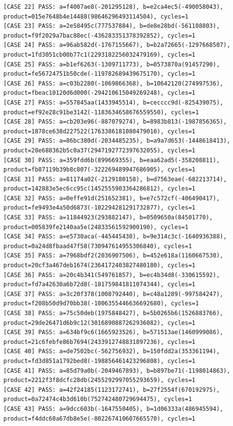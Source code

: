 \documentclass{article}
\begin{document}
\begin{verbatim}
[CASE 22] PASS: a=f4007ae8(-201295128), b=e2ca4ec5(-490058043), product=015e7648b4e14488(98646296493114504), cycles=1
[CASE 23] PASS: a=2e58495c(777537884), b=de8e28bd(-561108803), product=f9f2029a7bac88ec(-436283351378392852), cycles=1
[CASE 24] PASS: a=96ab582d(-1767155667), b=b2a72665(-1297668507), product=1fd3051cb00b77c1(2293182256032479169), cycles=1
[CASE 25] PASS: a=b1ef6263(-1309711773), b=0573870a(91457290), product=fe56724751b50cde(-119782689439675170), cycles=1
[CASE 26] PASS: a=c03b2280(-1069866368), b=10642120(274997536), product=fbeac10120d6d000(-294210615049269248), cycles=1
[CASE 27] PASS: a=557845aa(1433945514), b=cecccc9d(-825439075), product=ef92e28c91be3142(-1183634658676559550), cycles=1
[CASE 28] PASS: a=cb203e96(-887079274), b=8983b813(-1987856365), product=1878ce638d227522(1763386181080479010), cycles=1
[CASE 29] PASS: a=86bc380d(-2034485235), b=a9a7d653(-1448618413), product=28e688362b5c0a37(2947192772397632055), cycles=1
[CASE 30] PASS: a=359fdd6b(899669355), b=eaa62ad5(-358208811), product=fb87119b39b8c807(-322269489947686905), cycles=1
[CASE 31] PASS: a=81174a02(-2129180158), b=d7563eae(-682213714), product=142883e5ec6cc95c(1452555903364286812), cycles=1
[CASE 32] PASS: a=0effe91d(251652381), b=e7c572cf(-406490417), product=fe9493e4a50d6873(-102294281291732877), cycles=1
[CASE 33] PASS: a=11844923(293882147), b=0509650a(84501770), product=005839fe2140aa5e(24833561592900190), cycles=1
[CASE 34] PASS: a=e5730aca(-445445430), b=9e314c3c(-1640936388), product=0a24d8fbaad47f58(730947614955306840), cycles=1
[CASE 35] PASS: a=7968bdf2(2036907506), b=452e618a(1160667530), product=20cf3a467deb1674(2364172403827480180), cycles=1
[CASE 36] PASS: a=20c4b341(549761857), b=ec4b34d8(-330615592), product=fd7a42630a6b72d8(-181759841811074344), cycles=1
[CASE 37] PASS: a=3c20f378(1008792440), b=c48a1289(-997584247), product=f208b50d9d70bb38(-1006355446636692680), cycles=1
[CASE 38] PASS: a=75c50deb(1975848427), b=5b0265b6(1526883766), product=29de26471d6b9c12(3016890887262936082), cycles=1
[CASE 39] PASS: a=634bf9c6(1665923526), b=571513ae(1460999086), product=21c6febfe86b7694(2433912748831897236), cycles=1
[CASE 40] PASS: a=de7502bc(-562756932), b=150fdd2a(353361194), product=fd3d851a1792bed8(-198856461423296808), cycles=1
[CASE 41] PASS: a=85d79a0b(-2049467893), b=b897be71(-1198014863), product=2212f3f8dcfc28db(2455292997055293659), cycles=1
[CASE 42] PASS: a=42f24185(1123172741), b=27f2554f(670192975), product=0a72474c4b3d610b(752742480729694475), cycles=1
[CASE 43] PASS: a=9dcc603b(-1647550405), b=1d06333a(486945594), product=f4ddc60a67db8e5e(-802267410607665570), cycles=1

\end{verbatim}
\end{document}
